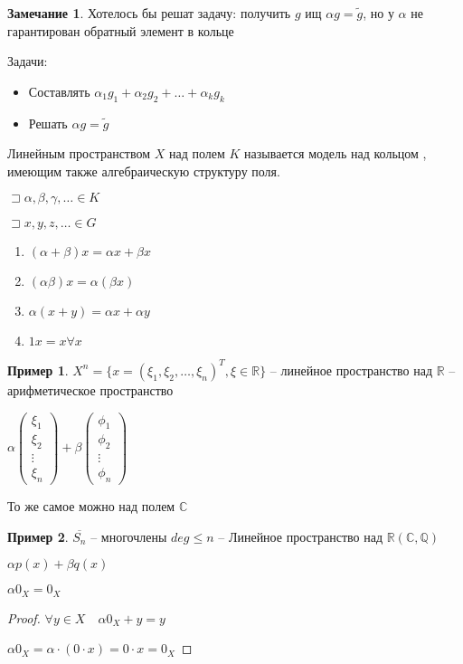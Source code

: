 \documentclass{book}
\newcommand\R{\ensuremath{\mathbb{R}}}
\newcommand\Q{\ensuremath{\mathbb{Q}}}
\renewcommand\C{\ensuremath{\mathbb{C}}}
\theoremstyle{definition}
\newtheorem*{note}{Замечание}
\newtheorem*{example}{Пример}
\begin{document}
\begin{note}
    Хотелось бы решат задачу: получить $g$ ищ  $\alpha g = \widetilde{g}$, но у  $\alpha$ не гарантирован обратный элемент в кольце
\end{note}

Задачи:
\begin{itemize}
    \item Составлять $\alpha_1g_1 + \alpha_2g_2 + \ldots + \alpha_kg_k$
    \item Решать $\alpha g = \widetilde{g}$
\end{itemize}

\begin{definition}
    Линейным пространством $X$ над полем $K$ называется модель над кольцом , имеющим также  алгебраическую структуру поля. 

    $\sqsupset \alpha, \beta, \gamma, \ldots\in K$

    $\sqsupset x, y, z, \ldots\in G$

    \begin{enumerate}
        \item $(\alpha+\beta)x = \alpha x + \beta x$
        \item  $(\alpha \beta)x = \alpha(\beta x)$
        \item $\alpha(x+y) = \alpha x + \alpha y$
        \item  $1 x = x \forall x$
    \end{enumerate}
\end{definition}

\begin{example}
    $X^n = \{x = \left( \xi_1, \xi_2, \ldots, \xi_n \right)^T, \xi\in \R\}$ -- линейное пространство над $\R$ -- арифметическое пространство

    $\alpha \begin{pmatrix} \xi_1\\ \xi_2 \\ \vdots \\ \xi_n \end{pmatrix}  + \beta \begin{pmatrix} \phi_1 \\ \phi_2 \\ \vdots \\ \phi_n \end{pmatrix} $ 

    То же самое можно над полем $\C$
\end{example}
\begin{example}
    $\overline{S_n}$ -- многочлены  $deg \leqslant n$ -- Линейное пространство над $\R(\C, \Q)$

    $\alpha p(x) + \beta q(x)$
\end{example}
\begin{lemma}
    $\alpha 0_X = 0_X$
\end{lemma}
\begin{proof}
    $\forall y\in X\quad \alpha 0_X + y = y$

    $\alpha 0_X = \alpha \cdot (0\cdot x) = 0\cdot x = 0_X$
\end{proof}
\end{document}
